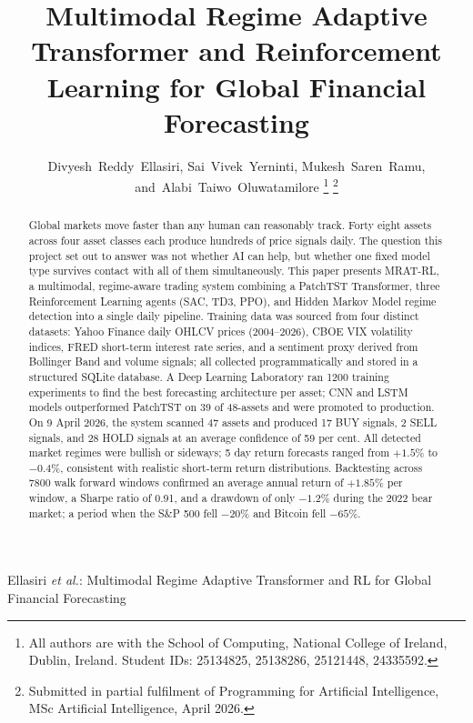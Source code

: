 \documentclass[journal]{IEEEtran}
\begin{document}
\title{Multimodal Regime Adaptive Transformer and Reinforcement\\
Learning for Global Financial Forecasting}

\author{Divyesh~Reddy~Ellasiri,
        Sai~Vivek~Yerninti,
        Mukesh~Saren~Ramu,
        and~Alabi~Taiwo~Oluwatamilore%
\thanks{All authors are with the School of Computing, National College of
Ireland, Dublin, Ireland. Student IDs: 25134825, 25138286, 25121448,
24335592.}%
\thanks{Submitted in partial fulfilment of Programming for Artificial
Intelligence, MSc Artificial Intelligence, April 2026.}}

%
{Ellasiri \MakeLowercase{\textit{et al.}}: Multimodal Regime Adaptive
Transformer and RL for Global Financial Forecasting}

\maketitle

\begin{abstract}
Global markets move faster than any human can reasonably track. Forty eight
assets across four asset classes each produce hundreds of price signals
daily. The question this project set out to answer was not whether AI can
help, but whether one fixed model type survives contact with all of them
simultaneously. This paper presents MRAT-RL, a multimodal, regime-aware
trading system combining a PatchTST Transformer, three Reinforcement
Learning agents (SAC, TD3, PPO), and Hidden Markov Model regime detection
into a single daily pipeline. Training data was sourced from four distinct
datasets: Yahoo Finance daily OHLCV prices (2004--2026), CBOE VIX
volatility indices, FRED short-term interest rate series, and a
sentiment proxy derived from Bollinger Band and volume signals; all
collected programmatically and stored in a structured SQLite database. A Deep Learning Laboratory ran 1200 training
experiments to find the best forecasting architecture per asset; CNN and
LSTM models outperformed PatchTST on 39 of 48-assets and were promoted to
production. On 9 April 2026, the system scanned 47 assets and produced 17
BUY signals, 2 SELL signals, and 28 HOLD signals at an average confidence
of 59 per cent. All detected market regimes were bullish or sideways; 5 day
return forecasts ranged from $+1.5\%$ to $-0.4\%$, consistent with
realistic short-term return distributions. Backtesting across 7800 walk
forward windows confirmed an average annual return of $+1.85\%$ per window,
a Sharpe ratio of 0.91, and a drawdown of only $-1.2\%$ during the 2022
bear market; a period when the S\&P 500 fell $-20\%$ and Bitcoin fell
$-65\%$.
\end{abstract}
\end{document}
